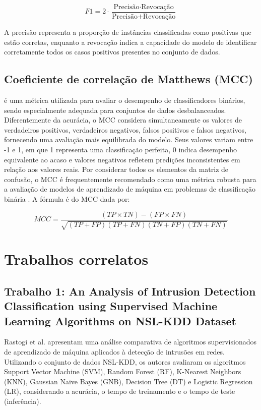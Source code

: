\documentclass[
    12pt,                %
    openright,           %
    oneside,             %
    a4paper,             %
    english,             %
    brazil               %
]{abntex2}
\begin{document}
\begin{equation}
F1 = 2 \cdot \frac{\text{Precisão} \cdot \text{Revocação}}{\text{Precisão} + \text{Revocação}}
\end{equation}

A precisão representa a proporção de instâncias classificadas como positivas que estão corretas, enquanto a revocação indica a capacidade do modelo de identificar corretamente todos os casos positivos presentes no conjunto de dados.

\subsection{Coeficiente de correlação de Matthews (MCC)}
é uma métrica utilizada para avaliar o desempenho de classificadores binários, sendo especialmente adequada para conjuntos de dados desbalanceados. Diferentemente da acurácia, o MCC considera simultaneamente os valores de verdadeiros positivos, verdadeiros negativos, falsos positivos e falsos negativos, fornecendo uma avaliação mais equilibrada do modelo. Seus valores variam entre -1 e 1, em que 1 representa uma classificação perfeita, 0 indica desempenho equivalente ao acaso e valores negativos refletem predições inconsistentes em relação aos valores reais. Por considerar todos os elementos da matriz de confusão, o MCC é frequentemente recomendado como uma métrica robusta para a avaliação de modelos de aprendizado de máquina em problemas de classificação binária \cite{Chicco2023}. 
A fórmula é do MCC dada por:

\begin{equation}
MCC = \frac{(TP \times TN) - (FP \times FN)}
{\sqrt{(TP + FP)(TP + FN)(TN + FP)(TN + FN)}}
\label{eq:mcc}
\end{equation}

\section{Trabalhos correlatos}
\label{sec:trabalhos_correlatos}

\subsection{Trabalho 1: An Analysis of Intrusion Detection Classification using Supervised Machine Learning Algorithms on NSL-KDD Dataset}

Rastogi et al. \cite{rastogi2022} apresentam uma análise comparativa de algoritmos supervisionados de aprendizado de máquina aplicados à detecção de intrusões em redes. Utilizando o conjunto de dados NSL-KDD, os autores avaliaram os algoritmos Support Vector Machine (SVM), Random Forest (RF), K-Nearest Neighbors (KNN), Gaussian Naive Bayes (GNB), Decision Tree (DT) e Logistic Regression (LR), considerando a acurácia, o tempo de treinamento e o tempo de teste (inferência).
\end{document}
